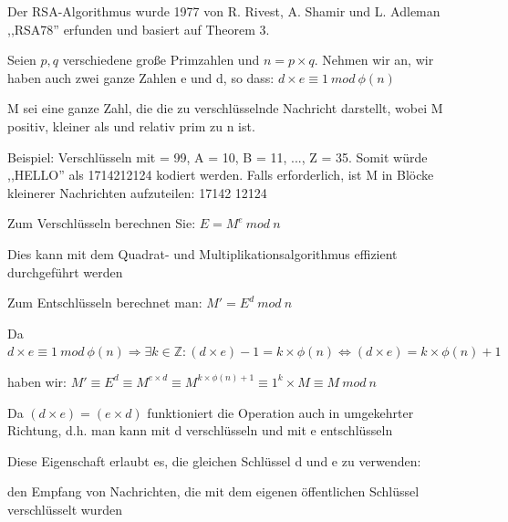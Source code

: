 \documentclass[a4paper]{article}
\begin{document}
\begin{multicols}{3}
      \begin{itemize*}
            \item Der RSA-Algorithmus wurde 1977 von R. Rivest, A. Shamir und L. Adleman
            ,,RSA78'' erfunden und basiert auf Theorem 3.
            \item Seien $p, q$ verschiedene große Primzahlen und
            $n=p\times q$. Nehmen wir an, wir haben auch zwei
            ganze Zahlen e und d, so dass: $d\times e \equiv 1\ mod\ \phi(n)$
            \item M sei eine ganze Zahl, die die zu verschlüsselnde Nachricht darstellt,
            wobei M positiv, kleiner als und relativ prim zu n ist.
            \begin{itemize*}
                  \item Beispiel: Verschlüsseln mit = 99, A = 10, B = 11, ..., Z = 35. Somit würde ,,HELLO'' als 1714212124 kodiert werden. Falls erforderlich, ist M in Blöcke kleinerer Nachrichten aufzuteilen: 17142 12124
            \end{itemize*}
            \item Zum Verschlüsseln berechnen Sie: $E = M^e\ mod\ n$
            \begin{itemize*}
                  \item Dies kann mit dem Quadrat- und Multiplikationsalgorithmus effizient durchgeführt werden
            \end{itemize*}
            \item Zum Entschlüsseln berechnet man: $M'=E^d\ mod\ n$
            \begin{itemize*}
                  \item Da $d\times e\equiv 1\ mod\ \phi(n)\Rightarrow\exists k\in\mathbb{Z}:(d\times e)-1=k\times\phi(n)\Leftrightarrow(d\times e)=k\times\phi(n)+1$
                  \item haben wir: $M'\equiv E^d\equiv M^{e\times d}\equiv M^{k\times\phi(n)+1}\equiv 1^k\times M\equiv M\ mod\ n$
            \end{itemize*}
            \item Da $(d\times e)=(e\times d)$
            funktioniert die Operation auch in umgekehrter Richtung, d.h. man kann
            mit d verschlüsseln und mit e entschlüsseln
            \begin{itemize*}
                  \item Diese Eigenschaft erlaubt es, die gleichen Schlüssel d und e zu verwenden:
                  \item den Empfang von Nachrichten, die mit dem eigenen öffentlichen Schlüssel verschlüsselt wurden

\end{itemize*}
\end{itemize*}
\end{multicols}
\end{document}
